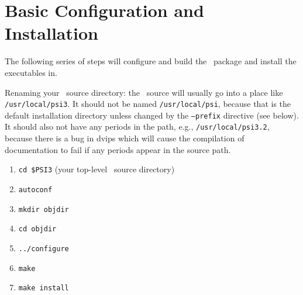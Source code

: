 \documentclass[12pt]{article}
\begin{document}
\section{Basic Configuration and Installation}

The following series of steps will configure and build the \PSIthree\
package and install the executables in.

Renaming your \PSIthree\ source directory: the \PSIthree\ source
will usually go into a place like {\tt /usr/local/psi3}.  It should not 
be named {\tt /usr/local/psi}, because that is the default installation
directory unless changed by the {\tt --prefix} directive (see below).
It should also not have any periods in the path, e.g., 
{\tt /usr/local/psi3.2}, because there is a bug in dvips which will 
cause the compilation of documentation to fail if any periods appear
in the source path.


\begin{enumerate}
\item {\tt cd \$PSI3} (your top-level \PSIthree\ source directory)
\item {\tt autoconf}
\item {\tt mkdir objdir}
\item {\tt cd objdir}
\item {\tt ../configure}
\item {\tt make}
\item {\tt make install}
\end{enumerate}
\end{document}

